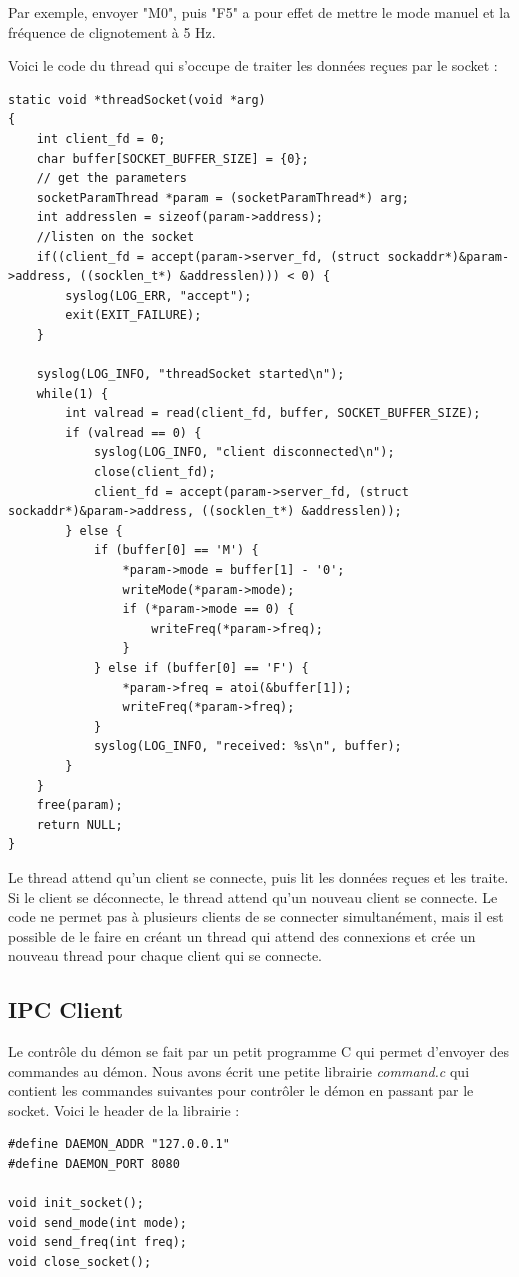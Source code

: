 \documentclass[
	a4paper, %
	10pt, %
]{CSUniSchoolLabReport}
\begin{document}
Par exemple, envoyer "M0", puis "F5" a pour effet de mettre le mode manuel et la fréquence de clignotement à 5 Hz.

Voici le code du thread qui s'occupe de traiter les données reçues par le socket : \\
\begin{lstlisting}[style=CStyle]
static void *threadSocket(void *arg)
{
	int client_fd = 0;
	char buffer[SOCKET_BUFFER_SIZE] = {0};
	// get the parameters
	socketParamThread *param = (socketParamThread*) arg;
	int addresslen = sizeof(param->address);
	//listen on the socket
	if((client_fd = accept(param->server_fd, (struct sockaddr*)&param->address, ((socklen_t*) &addresslen))) < 0) {
		syslog(LOG_ERR, "accept");
		exit(EXIT_FAILURE);
	}

	syslog(LOG_INFO, "threadSocket started\n");
	while(1) {
		int valread = read(client_fd, buffer, SOCKET_BUFFER_SIZE);
		if (valread == 0) {
			syslog(LOG_INFO, "client disconnected\n");
			close(client_fd);
			client_fd = accept(param->server_fd, (struct sockaddr*)&param->address, ((socklen_t*) &addresslen));
		} else {
			if (buffer[0] == 'M') {
				*param->mode = buffer[1] - '0';
				writeMode(*param->mode);
				if (*param->mode == 0) {
					writeFreq(*param->freq);
				}
			} else if (buffer[0] == 'F') {
				*param->freq = atoi(&buffer[1]);
				writeFreq(*param->freq);
			}
			syslog(LOG_INFO, "received: %s\n", buffer);
		}
	}
	free(param);
	return NULL;
}
\end{lstlisting}
Le thread attend qu'un client se connecte, puis lit les données reçues et les traite.
Si le client se déconnecte, le thread attend qu'un nouveau client se connecte.
Le code ne permet pas à plusieurs clients de se connecter simultanément, mais il est possible de le faire en créant un thread qui attend des connexions et crée un nouveau thread pour chaque client qui se connecte. \\

\newpage
\subsection{IPC Client}\label{IPCClient}
Le contrôle du démon se fait par un petit programme C qui permet d'envoyer des commandes au démon.
Nous avons écrit une petite librairie \textit{command.c} qui contient les commandes suivantes pour contrôler le démon en passant par le socket. Voici le header de la librairie : \\
\begin{lstlisting}[style=CStyle]
#define DAEMON_ADDR "127.0.0.1"
#define DAEMON_PORT 8080

void init_socket();
void send_mode(int mode);
void send_freq(int freq);
void close_socket();
\end{lstlisting}
\end{document}
